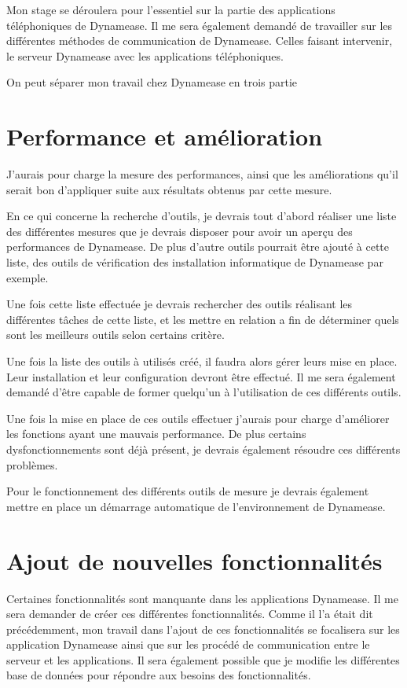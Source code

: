 Mon stage se déroulera pour l'essentiel sur la partie des applications téléphoniques de Dynamease. Il me sera également demandé de travailler sur les différentes méthodes de communication de Dynamease. Celles faisant intervenir, le serveur Dynamease avec les applications téléphoniques.

On peut séparer mon travail chez Dynamease en trois partie 

\section{Performance et amélioration}

J'aurais pour charge la mesure des performances, ainsi que les améliorations qu'il serait bon d'appliquer suite aux résultats obtenus par cette mesure. 

En ce qui concerne la recherche d'outils, je devrais tout d'abord réaliser une liste des différentes mesures que je devrais disposer pour avoir un aperçu des performances de Dynamease. De plus d'autre outils pourrait être ajouté à cette liste, des outils de vérification des installation informatique de Dynamease par exemple.

Une fois cette liste effectuée je devrais rechercher des outils réalisant les différentes tâches de cette liste, et les mettre en relation a fin de déterminer quels sont les meilleurs outils selon certains critère.

Une fois la liste des outils à utilisés créé, il faudra alors gérer leurs mise en place. Leur installation et leur configuration devront être effectué. Il me sera également demandé d'être capable de former quelqu'un à l'utilisation de ces différents outils.

Une fois la mise en place de ces outils effectuer j'aurais pour charge d'améliorer les fonctions ayant une mauvais performance. De plus certains dysfonctionnements sont déjà présent, je devrais également résoudre ces différents problèmes.

Pour le fonctionnement des différents outils de mesure je devrais également mettre en place un démarrage automatique de l'environnement de Dynamease.

\section{Ajout de nouvelles fonctionnalités}

Certaines fonctionnalités sont manquante dans les applications Dynamease. Il me sera demander de créer ces différentes fonctionnalités. Comme il l'a était dit précédemment, mon travail dans l'ajout de ces fonctionnalités se focalisera sur les application Dynamease ainsi que sur les procédé de communication entre le serveur et les applications. Il sera également possible que je modifie les différentes base de données pour répondre aux besoins des fonctionnalités.

